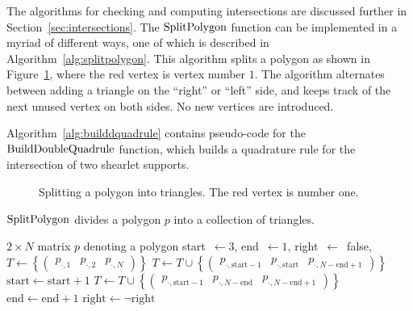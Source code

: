 The algorithms for checking and computing intersections are discussed further in
Section~\ref{sec:intersections}. The $\operatorname{SplitPolygon}$ function can be implemented in a myriad of different
ways, one of which is described in Algorithm~\ref{alg:splitpolygon}. This algorithm splits a polygon as shown
in Figure~\ref{fig:splitpolygon}, where the red vertex is vertex number $1$. The algorithm alternates between
adding a triangle on the ``right'' or ``left'' side, and keeps track of the next unused vertex on both sides.
No new vertices are introduced.

Algorithm~\ref{alg:builddquadrule} contains pseudo-code for the $\operatorname{BuildDoubleQuadrule}$ function, which builds a
quadrature rule for the intersection of two shearlet supports. 

\begin{figure}
\centering
{}
\caption{Splitting a polygon into triangles. The red vertex is number one.} \label{fig:splitpolygon}
\end{figure}

\begin{algorithm}
\caption{$\operatorname{SplitPolygon}$ divides a polygon $p$ into a collection of triangles.}
\label{alg:splitpolygon}
\begin{algorithmic}[1]
\REQUIRE $2\times N$ matrix $p$ denoting a polygon
\STATE start\ $\leftarrow3$, end\ $\leftarrow1$, right\ $\leftarrow$\ false, $T\leftarrow \left\{\begin{pmatrix}
p_{\cdot,1}&p_{\cdot,2}&p_{\cdot,N} \end{pmatrix}\right\}$ 
\STATE $T\leftarrow T\cup\left\{\begin{pmatrix}
p_{\cdot,\mathrm{start}-1}&p_{\cdot,\mathrm{start}}&p_{\cdot,N-\mathrm{end}+1} \end{pmatrix}\right\}$
\STATE $\text{start} \leftarrow \text{start} + 1$
\ELSE
\STATE $T\leftarrow T\cup\left\{\begin{pmatrix}
p_{\cdot,\mathrm{start}-1}&p_{\cdot,N-\mathrm{end}}&p_{\cdot,N-\mathrm{end}+1} \end{pmatrix}\right\}$
\STATE $\text{end} \leftarrow \text{end} + 1$
\ENDIF
\STATE $\text{right} \leftarrow \neg\text{right}$
\ENDWHILE
\end{algorithmic}
\end{algorithm}

